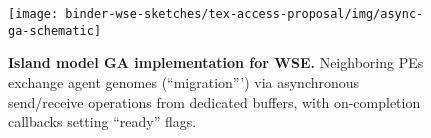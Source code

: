 \begin{figure}
  \centering
\texttt{[image: binder-wse-sketches/tex-access-proposal/img/async-ga-schematic]}
  \caption{%
  \textbf{Island model GA implementation for WSE.}
  Neighboring PEs exchange agent genomes (``migration''') via asynchronous send/receive operations from dedicated buffers, with on-completion callbacks setting ``ready'' flags.
  }
  \label{fig:async-ga-schematic}
  \vspace{-0.2in}
\end{figure}
